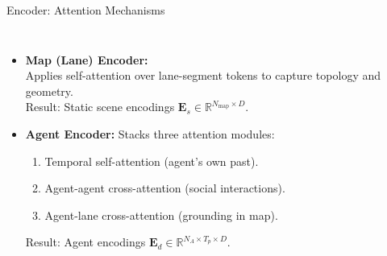 \documentclass[10pt,aspectratio=169]{beamer}
\begin{document}
\begin{frame}{Encoder: Attention Mechanisms}
  \begin{columns}[T]
      \begin{itemize}
        \item<1-> \textbf{Map (Lane) Encoder:}\\
          Applies self-attention over lane-segment tokens to capture topology and geometry.\\
          Result: Static scene encodings \(\mathbf{E}_s \in \mathbb{R}^{N_{\text{map}} \times D}\).
        \item<2-> \textbf{Agent Encoder:} Stacks three attention modules:
          \begin{enumerate}[<+->]
            \item Temporal self-attention (agent's own past).
            \item Agent-agent cross-attention (social interactions).
            \item Agent-lane cross-attention (grounding in map).
          \end{enumerate}
          Result: Agent encodings \(\mathbf{E}_d \in \mathbb{R}^{N_{A} \times T_{p} \times D}\).
      \end{itemize}

  \end{columns}
\end{frame}
\end{document}
